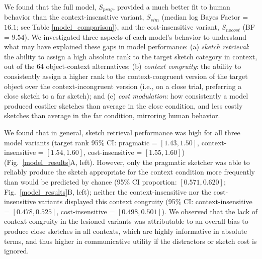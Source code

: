 \documentclass[9pt,twocolumn,twoside]{pnas-new}
\begin{document}

We found that the full model, $S_{prag}$, provided a much better fit to human behavior than the context-insensitive variant, $S_{sim}$ (median log Bayes Factor = $16.1$; see Table \ref{model_comparison}), and the cost-insensitive variant, $S_{nocost}$ (BF = $9.54$).
We investigated three aspects of each model's behavior to understand what may have explained these gaps in model performance: (a) \textit{sketch retrieval}: the ability to assign a high absolute rank to the target sketch category in context, out of the 64 object-context alternatives; (b) \textit{context congruity}: the ability to consistently assign a higher rank to the context-congruent version of the target object over the context-incongruent version (i.e., on a close trial, preferring a close sketch to a far sketch); and (c) \textit{cost modulation}: how consistently a model produced costlier sketches than average in the close condition, and less costly sketches than average in the far condition, mirroring human behavior.

We found that in general, sketch retrieval performance was high for all three model variants (target rank 95\% CI: pragmatic = $[1.43, 1.50]$, context-insensitive = $[1.54, 1.60]$, cost-insensitive = $[1.55, 1.60]$) (Fig.~\ref{model_results}A, left).
However, only the pragmatic sketcher was able to reliably produce the sketch appropriate for the context condition more frequently than would be predicted by chance (95\% CI proportion: $[0.571, 0.620]$; Fig.~\ref{model_results}B, left); neither the context-insensitive nor the cost-insensitive variants displayed this context congruity (95\% CI: context-insensitive = $[0.478, 0.525]$, cost-insensitive = $[0.498, 0.501]$). 
We observed that the lack of context congruity in the lesioned variants was attributable to an overall bias to produce close sketches in all contexts, which are highly informative in absolute terms, and thus higher in communicative utility if the distractors or sketch cost is ignored. 
\end{document}
